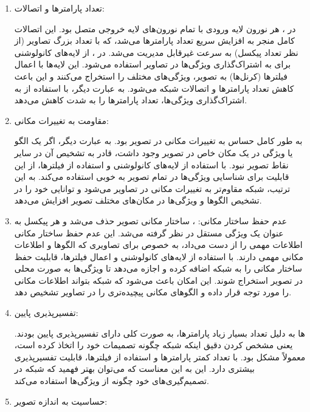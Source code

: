\documentclass{article}
\begin{document}
\begin{enumerate}

\item تعداد پارامترها و اتصالات:

در ، هر نورون لایه ورودی با تمام نورون‌های لایه خروجی متصل بود. این اتصالات کامل منجر به افزایش سریع تعداد پارامترها می‌شد، که با تعداد بزرگ تصاویر (از نظر تعداد پیکسل) به سرعت غیرقابل مدیریت می‌شد.
    در ، از لایه‌های کانولوشنی برای به اشتراک‌گذاری ویژگی‌ها در تصاویر استفاده می‌شود. این لایه‌ها با اعمال فیلترها (کرنل‌ها) به تصویر، ویژگی‌های مختلف را استخراج می‌کنند و این باعث کاهش تعداد پارامترها و اتصالات شبکه می‌شود. به عبارت دیگر،  با استفاده از به اشتراک‌گذاری ویژگی‌ها، تعداد پارامترها را به شدت کاهش می‌دهد.

\item مقاومت به تغییرات مکانی:

 به طور کامل حساس به تغییرات مکانی در تصویر بود. به عبارت دیگر، اگر یک الگو یا ویژگی در یک مکان خاص در تصویر وجود داشت،  قادر به تشخیص آن در سایر نقاط تصویر نبود.  با استفاده از لایه‌های کانولوشنی و استفاده از فیلترها، از این قابلیت برای شناسایی ویژگی‌ها در تمام تصویر به خوبی استفاده می‌کند. به این ترتیب، شبکه  مقاوم‌تر به تغییرات مکانی در تصاویر می‌شود و توانایی خود را در تشخیص الگوها و ویژگی‌ها در مکان‌های مختلف تصویر افزایش می‌دهد.

\item عدم حفظ ساختار مکانی:
، ساختار مکانی تصویر حذف می‌شد و هر پیکسل به عنوان یک ویژگی مستقل در نظر گرفته می‌شد. این عدم حفظ ساختار مکانی اطلاعات مهمی را از دست می‌داد، به خصوص برای تصاویری که الگوها و اطلاعات مکانی مهمی دارند.
     با استفاده از لایه‌های کانولوشنی و اعمال فیلترها، قابلیت حفظ ساختار مکانی را به شبکه اضافه کرده و اجازه می‌دهد تا ویژگی‌ها به صورت محلی در تصویر استخراج شوند. این امکان باعث می‌شود که شبکه بتواند اطلاعات مکانی را مورد توجه قرار داده و الگوهای مکانی پیچیده‌تری را در تصاویر تشخیص دهد.

\item تفسیرپذیری پایین:

    ‌ها به دلیل تعداد بسیار زیاد پارامترها، به صورت کلی دارای تفسیرپذیری پایین بودند. یعنی مشخص کردن دقیق اینکه شبکه چگونه تصمیمات خود را اتخاذ کرده است، معمولاً مشکل بود.
     با تعداد کمتر پارامترها و استفاده از فیلترها، قابلیت تفسیرپذیری بیشتری دارد. این به این معناست که می‌توان بهتر فهمید که شبکه در تصمیم‌گیری‌های خود چگونه از ویژگی‌ها استفاده می‌کند.

\item حساسیت به اندازه تصویر:


\end{enumerate}
\end{document}
